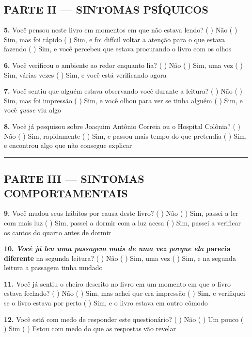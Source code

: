 \subsection*{PARTE II --- SINTOMAS PSÍQUICOS}

\noindent \textbf{5.} Você pensou neste livro em momentos em que não estava lendo?
( ) Não
( ) Sim, mas foi rápido
( ) Sim, e foi difícil voltar a atenção para o que estava fazendo
( ) Sim, e você percebeu que estava procurando o livro com os olhos

\noindent \textbf{6.} Você verificou o ambiente ao redor enquanto lia?
( ) Não
( ) Sim, uma vez
( ) Sim, várias vezes
( ) Sim, e você está verificando agora

\noindent \textbf{7.} Você sentiu que alguém estava observando você durante a leitura?
( ) Não
( ) Sim, mas foi impressão
( ) Sim, e você olhou para ver se tinha alguém
( ) Sim, e você \textit{quase} viu algo

\noindent \textbf{8.} Você já pesquisou sobre Joaquim Antônio Correia ou o Hospital Colônia?
( ) Não
( ) Sim, rapidamente
( ) Sim, e passou mais tempo do que pretendia
( ) Sim, e encontrou algo que não consegue explicar

\vspace{0.5em}\noindent\rule{\textwidth}{0.5pt}\vspace{0.5em}

\subsection*{PARTE III --- SINTOMAS COMPORTAMENTAIS}

\noindent \textbf{9.} Você mudou seus hábitos por causa deste livro?
( ) Não
( ) Sim, passei a ler com mais luz
( ) Sim, passei a dormir com a luz acesa
( ) Sim, passei a verificar os cantos do quarto antes de dormir

\noindent \textbf{10.\textit{ Você já leu uma passagem mais de uma vez porque ela }parecia diferente} na segunda leitura?
( ) Não
( ) Sim, uma vez
( ) Sim, e na segunda leitura a passagem tinha mudado

\noindent \textbf{11.} Você já sentiu o cheiro descrito no livro em um momento em que o livro estava fechado?
( ) Não
( ) Sim, mas achei que era impressão
( ) Sim, e verifiquei se o livro estava por perto
( ) Sim, e o livro estava em outro cômodo

\noindent \textbf{12.} Você está com medo de responder este questionário?
( ) Não
( ) Um pouco
( ) Sim
( ) Estou com medo do que as respostas vão revelar

